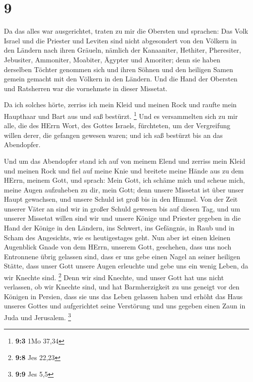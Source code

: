 \hypertarget{section-2}{%
\section{9}\label{section-2}}

 Da das alles war ausgerichtet, traten zu mir die Obersten
und sprachen: Das Volk Israel und die Priester und Leviten sind nicht
abgesondert von den Völkern in den Ländern nach ihren Gräueln, nämlich
der Kanaaniter, Hethiter, Pheresiter, Jebusiter, Ammoniter, Moabiter,
Ägypter und Amoriter;  denn sie haben derselben Töchter
genommen sich und ihren Söhnen und den heiligen Samen gemein gemacht mit
den Völkern in den Ländern. Und die Hand der Obersten und Ratsherren war
die vornehmste in dieser Missetat.

 Da ich solches hörte, zerriss ich mein Kleid und meinen
Rock und raufte mein Haupthaar und Bart aus und saß bestürzt.
\footnote{\textbf{9:3} 1Mo 37,34}  Und es versammelten sich
zu mir alle, die des HErrn Wort, des Gottes Israels, fürchteten, um der
Vergreifung willen derer, die gefangen gewesen waren; und ich saß
bestürzt bis an das Abendopfer.

 Und um das Abendopfer stand ich auf von meinem Elend und
zerriss mein Kleid und meinen Rock und fiel auf meine Knie und breitete
meine Hände aus zu dem HErrn, meinem Gott,  und sprach: Mein
Gott, ich schäme mich und scheue mich, meine Augen aufzuheben zu dir,
mein Gott; denn unsere Missetat ist über unser Haupt gewachsen, und
unsere Schuld ist groß bis in den Himmel.  Von der Zeit
unserer Väter an sind wir in großer Schuld gewesen bis auf diesen Tag,
und um unserer Missetat willen sind wir und unsere Könige und Priester
gegeben in die Hand der Könige in den Ländern, ins Schwert, ins
Gefängnis, in Raub und in Scham des Angesichts, wie es heutigestages
geht.  Nun aber ist einen kleinen Augenblick Gnade von dem
HErrn, unserem Gott, geschehen, dass uns noch Entronnene übrig gelassen
sind, dass er uns gebe einen Nagel an seiner heiligen Stätte, dass unser
Gott unsere Augen erleuchte und gebe uns ein wenig Leben, da wir Knechte
sind. \footnote{\textbf{9:8} Jes 22,23}  Denn wir sind
Knechte, und unser Gott hat uns nicht verlassen, ob wir Knechte sind,
und hat Barmherzigkeit zu uns geneigt vor den Königen in Persien, dass
sie uns das Leben gelassen haben und erhöht das Haus unseres Gottes und
aufgerichtet seine Verstörung und uns gegeben einen Zaun in Juda und
Jerusalem. \footnote{\textbf{9:9} Jes 5,5}

